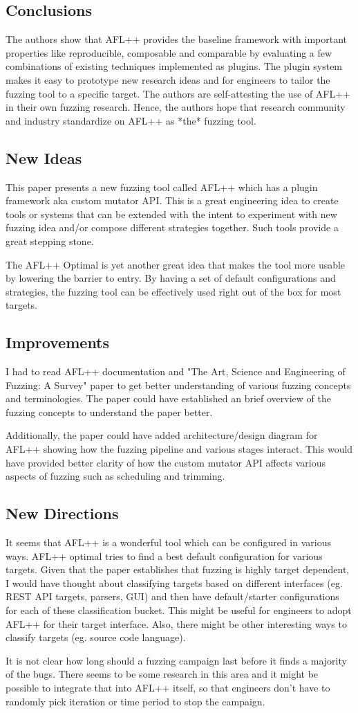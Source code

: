 \documentclass[12pt]{article}
\begin{document}
    \subsection*{Conclusions}
    The authors show that AFL++ provides the baseline framework with important properties like reproducible, composable and comparable by evaluating a few combinations of existing techniques implemented as plugins. The plugin system makes it easy to prototype new research ideas and for engineers to tailor the fuzzing tool to a specific target. The authors are self-attesting the use of AFL++ in their own fuzzing research. Hence, the authors hope that research community and industry standardize on AFL++ as *the* fuzzing tool.

    \subsection*{New Ideas}
    This paper presents a new fuzzing tool called AFL++ which has a plugin framework aka custom mutator API. This is a great engineering idea to create tools or systems that can be extended with the intent to experiment with new fuzzing idea and/or compose different strategies together. Such tools provide a great stepping stone.

    The AFL++ Optimal is yet another great idea that makes the tool more usable by lowering the barrier to entry. By having a set of default configurations and strategies, the fuzzing tool can be effectively used right out of the box for most targets.

    \subsection*{Improvements}
    I had to read AFL++ documentation and "The Art, Science and Engineering of Fuzzing: A Survey" paper to get better understanding of various fuzzing concepts and terminologies. The paper could have established an brief overview of the fuzzing concepts to understand the paper better.

    Additionally, the paper could have added architecture/design diagram for AFL++ showing how the fuzzing pipeline and various stages interact. This would have provided better clarity of how the custom mutator API affects various aspects of fuzzing such as scheduling and trimming.

    \subsection*{New Directions}
    It seems that AFL++ is a wonderful tool which can be configured in various ways. AFL++ optimal tries to find a best default configuration for various targets. Given that the paper establishes that fuzzing is highly target dependent, I would have thought about classifying targets based on different interfaces (eg. REST API targets, parsers, GUI) and then have default/starter configurations for each of these classification bucket. This might be useful for engineers to adopt AFL++ for their target interface. Also, there might be other interesting ways to classify targets (eg. source code language).
    
    It is not clear how long should a fuzzing campaign last before it finds a majority of the bugs. There seems to be some research in this area and it might be possible to integrate that into AFL++ itself, so that engineers don't have to randomly pick iteration or time period to stop the campaign.
\end{document}
